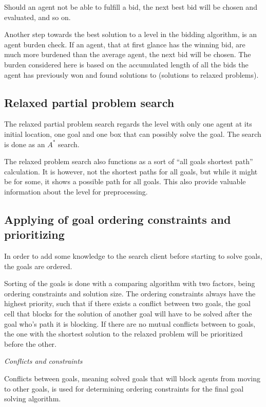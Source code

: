 \documentclass[Main]{subfiles}
\begin{document}
Should an agent not be able to fulfill a bid, the next best bid will be chosen and evaluated, and so on. 

Another step towards the best solution to a level in the bidding algorithm, is an agent burden check. If an agent, that at first glance has the winning bid, are much more burdened than the average agent, the next bid will be chosen. The burden considered here is based on the accumulated length of all the bids the agent has previously won and found solutions to (solutions to relaxed problems). 


\subsection{Relaxed partial problem search}
The relaxed partial problem search regards the level with only one agent at its initial location, one goal and one box that can possibly solve the goal. The search is done as an $A^*$ search. 

The relaxed problem search also functions as a sort of ``all goals shortest path'' calculation. It is however, not the shortest paths for all goals, but while it might be for some, it shows a possible path for all goals. This also provide valuable information about the level for preprocessing.



\subsection{Applying of goal ordering constraints and prioritizing}
\label{sec:goal_ordering}
In order to add some knowledge to the search client before starting to solve goals, the goals are ordered. 

Sorting of the goals is done with a comparing algorithm with two factors, being ordering constraints and solution size. The ordering constraints always have the highest priority, such that if there exists a conflict between two goals, the goal cell that blocks for the solution of another goal will have to be solved after the goal who's path it is blocking. If there are no mutual conflicts between to goals, the one with the shortest solution to the relaxed problem will be prioritized before the other. 


\textit{Conflicts and constraints}

Conflicts between goals, meaning solved goals that will block agents from moving to other goals, is used for determining ordering constraints for the final goal solving algorithm. 
\end{document}
